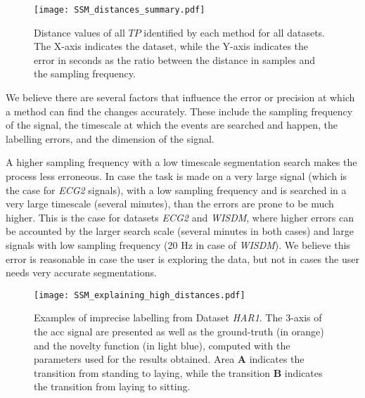  \begin{figure}
\texttt{[image: SSM\_distances\_summary.pdf]}
\caption{Distance values of all $TP$ identified by each method for all datasets. The X-axis indicates the dataset, while the Y-axis indicates the error in seconds as the ratio between the distance in samples and the sampling frequency.}
\label{fig:error_distribution}
\end{figure}

We believe there are several factors that influence the error or precision at which a method can find the changes accurately. These include the sampling frequency of the signal, the timescale at which the events are searched and happen, the labelling errors, and the dimension of the signal. 

A higher sampling frequency with a low timescale segmentation search makes the process less erroneous. In case the task is made on a very large signal (which is the case for \textit{ECG2} signals), with a low sampling frequency and is searched in a very large timescale (several minutes), than the errors are prone to be much higher. This is the case for datasets \textit{ECG2} and \textit{WISDM}, where higher errors can be accounted by the larger search scale (several minutes in both cases) and large signals with low sampling frequency (20 Hz in case of \textit{WISDM}). We believe this error is reasonable in case the user is exploring the data, but not in cases the user needs very accurate segmentations. 

 \begin{figure}
\texttt{[image: SSM\_explaining\_high\_distances.pdf]}
\caption{Examples of imprecise labelling from Dataset \textit{HAR1}. The 3-axis of the \gls{acc} signal are presented as well as the ground-truth (in orange) and the novelty function (in light blue), computed with the parameters used for the results obtained. Area \textbf{A} indicates the transition from standing to laying, while the transition \textbf{B} indicates the transition from laying to sitting.}
\label{fig:example_badlabel}
\end{figure}

